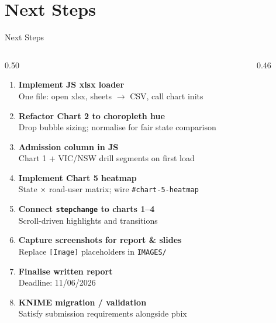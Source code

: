 \documentclass[aspectratio=169]{beamer}
\begin{document}
\section{Next Steps}

\begin{frame}{Next Steps}
  \begin{columns}[T]
    \begin{column}{0.50\textwidth}
      \begin{enumerate}
        \setlength\itemsep{0.45em}
        \item \textbf{Implement JS xlsx loader}\\
              {\small One file: open xlsx, sheets $\to$ CSV, call chart inits}
        \item \textbf{Refactor Chart 2 to choropleth hue}\\
              {\small Drop bubble sizing; normalise for fair state comparison}
        \item \textbf{Admission column in JS}\\
              {\small Chart 1 + VIC/NSW drill segments on first load}
        \item \textbf{Implement Chart 5 heatmap}\\
              {\small State $\times$ road-user matrix; wire \texttt{\#chart-5-heatmap}}
        \item \textbf{Connect \texttt{stepchange} to charts 1--4}\\
              {\small Scroll-driven highlights and transitions}
        \item \textbf{Capture screenshots for report \& slides}\\
              {\small Replace \texttt{[Image]} placeholders in \texttt{IMAGES/}}
        \item \textbf{Finalise written report}\\
              {\small Deadline: 11/06/2026}
        \item \textbf{KNIME migration / validation}\\
              {\small Satisfy submission requirements alongside pbix}
      \end{enumerate}
    \end{column}
    \begin{column}{0.46\textwidth}
      \vspace{0.5em}
    \end{column}
  \end{columns}
\end{frame}
\end{document}
